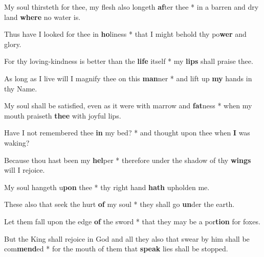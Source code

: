 \begin{multicols}{2}
	My soul thirsteth for thee, my flesh also longeth \textbf{af}ter thee * in a barren and dry land \textbf{where} no water is.
	
	Thus have I looked for thee in \textbf{ho}liness * that I might behold thy po\textbf{wer} and glory.
	
	For thy loving-kindness is better than the \textbf{life} itself * my \textbf{lips} shall praise thee.
	
	As long as I live will I magnify thee on this \textbf{man}ner * and lift up \textbf{my} hands in thy Name.
	
	My soul shall be satisfied, even as it were with marrow and \textbf{fat}ness * when my mouth praiseth \textbf{thee} with joyful lips.
	
	Have I not remembered thee \textbf{in} my bed? * and thought upon thee when \textbf{I} was waking?
	
	Because thou hast been my \textbf{hel}per * therefore under the shadow of thy \textbf{wings} will I rejoice.
	
	My soul hangeth u\textbf{pon} thee * thy right hand \textbf{hath} upholden me.
	
	These also that seek the hurt \textbf{of} my soul * they shall go \textbf{un}der the earth.
	
	Let them fall upon the edge \textbf{of} the sword * that they may be a por\textbf{tion} for foxes.
	
	But the King shall rejoice in God and all they also that swear by him shall be com\textbf{mend}ed * for the mouth of them that \textbf{speak} lies shall be stopped.
\end{multicols}